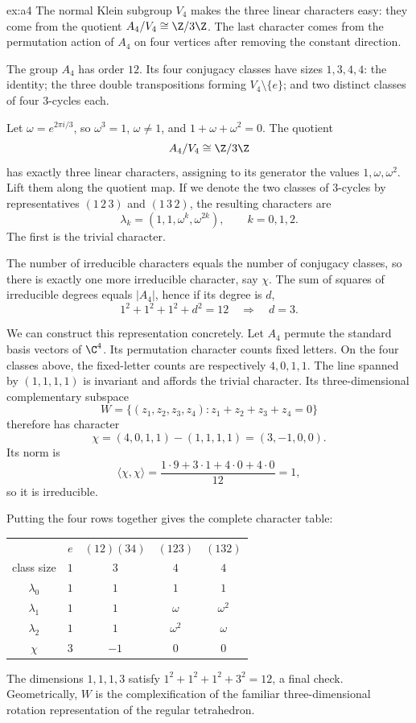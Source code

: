 \begin{solution}{ex:a4}
\idea The normal Klein subgroup $V_4$ makes the three linear characters easy: they come from the quotient $A_4/V_4\cong\Z/3\Z$. The last character comes from the permutation action of $A_4$ on four vertices after removing the constant direction.

\writeup The group $A_4$ has order $12$. Its four conjugacy classes have sizes $1,3,4,4$: the identity; the three double transpositions forming $V_4\setminus\{e\}$; and two distinct classes of four $3$-cycles each.

Let $\omega=e^{2\pi i/3}$, so $\omega^3=1$, $\omega\ne1$, and $1+\omega+\omega^2=0$. The quotient
\[
A_4/V_4\cong\Z/3\Z
\]
has exactly three linear characters, assigning to its generator the values $1,\omega,\omega^2$. Lift them along the quotient map. If we denote the two classes of $3$-cycles by representatives $(1\,2\,3)$ and $(1\,3\,2)$, the resulting characters are
\[
\lambda_k=(1,1,\omega^k,\omega^{2k}),
\qquad k=0,1,2.
\]
The first is the trivial character.

The number of irreducible characters equals the number of conjugacy classes, so there is exactly one more irreducible character, say $\chi$. The sum of squares of irreducible degrees equals $|A_4|$, hence if its degree is $d$,
\[
1^2+1^2+1^2+d^2=12
\quad\Longrightarrow\quad d=3.
\]

We can construct this representation concretely. Let $A_4$ permute the standard basis vectors of $\C^4$. Its permutation character counts fixed letters. On the four classes above, the fixed-letter counts are respectively $4,0,1,1$. The line spanned by $(1,1,1,1)$ is invariant and affords the trivial character. Its three-dimensional complementary subspace
\[
W=\{(z_1,z_2,z_3,z_4):z_1+z_2+z_3+z_4=0\}
\]
therefore has character
\[
\chi=(4,0,1,1)-(1,1,1,1)=(3,-1,0,0).
\]
Its norm is
\[
\langle\chi,\chi\rangle
=\frac{1\cdot9+3\cdot1+4\cdot0+4\cdot0}{12}=1,
\]
so it is irreducible.

Putting the four rows together gives the complete character table:
\begin{center}
\small
\begin{tabular}{c|cccc}
 & $e$ & $(12)(34)$ & $(123)$ & $(132)$\\
class size & $1$ & $3$ & $4$ & $4$\\\hline
$\lambda_0$ & $1$ & $1$ & $1$ & $1$\\
$\lambda_1$ & $1$ & $1$ & $\omega$ & $\omega^2$\\
$\lambda_2$ & $1$ & $1$ & $\omega^2$ & $\omega$\\
$\chi$ & $3$ & $-1$ & $0$ & $0$
\end{tabular}
\end{center}
The dimensions $1,1,1,3$ satisfy $1^2+1^2+1^2+3^2=12$, a final check. Geometrically, $W$ is the complexification of the familiar three-dimensional rotation representation of the regular tetrahedron.
\end{solution}

